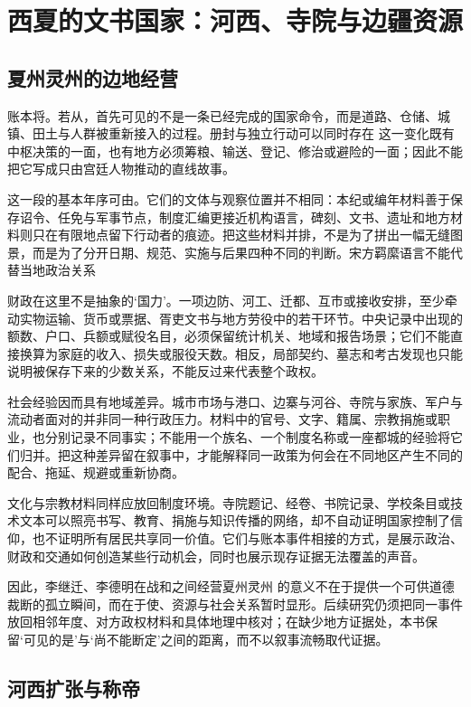 \section{西夏的文书国家：河西、寺院与边疆资源}

\subsection{夏州灵州的边地经营}

账本将。若从，首先可见的不是一条已经完成的国家命令，而是道路、仓储、城镇、田土与人群被重新接入的过程。册封与独立行动可以同时存在 这一变化既有中枢决策的一面，也有地方必须筹粮、输送、登记、修治或避险的一面；因此不能把它写成只由宫廷人物推动的直线故事。

这一段的基本年序可由。它们的文体与观察位置并不相同：本纪或编年材料善于保存诏令、任免与军事节点，制度汇编更接近机构语言，碑刻、文书、遗址和地方材料则只在有限地点留下行动者的痕迹。把这些材料并排，不是为了拼出一幅无缝图景，而是为了分开日期、规范、实施与后果四种不同的判断。宋方羁縻语言不能代替当地政治关系

财政在这里不是抽象的‘国力’。一项边防、河工、迁都、互市或接收安排，至少牵动实物运输、货币或票据、胥吏文书与地方劳役中的若干环节。中央记录中出现的额数、户口、兵额或赋役名目，必须保留统计机关、地域和报告场景；它们不能直接换算为家庭的收入、损失或服役天数。相反，局部契约、墓志和考古发现也只能说明被保存下来的少数关系，不能反过来代表整个政权。

社会经验因而具有地域差异。城市市场与港口、边寨与河谷、寺院与家族、军户与流动者面对的并非同一种行政压力。材料中的官号、文字、籍属、宗教捐施或职业，也分别记录不同事实；不能用一个族名、一个制度名称或一座都城的经验将它们归并。把这种差异留在叙事中，才能解释同一政策为何会在不同地区产生不同的配合、拖延、规避或重新协商。

文化与宗教材料同样应放回制度环境。寺院题记、经卷、书院记录、学校条目或技术文本可以照亮书写、教育、捐施与知识传播的网络，却不自动证明国家控制了信仰，也不证明所有居民共享同一价值。它们与账本事件相接的方式，是展示政治、财政和交通如何创造某些行动机会，同时也展示现存证据无法覆盖的声音。

因此，李继迁、李德明在战和之间经营夏州灵州 的意义不在于提供一个可供道德裁断的孤立瞬间，而在于使、资源与社会关系暂时显形。后续研究仍须把同一事件放回相邻年度、对方政权材料和具体地理中核对；在缺少地方证据处，本书保留‘可见的是’与‘尚不能断定’之间的距离，而不以叙事流畅取代证据。

\subsection{河西扩张与称帝}

